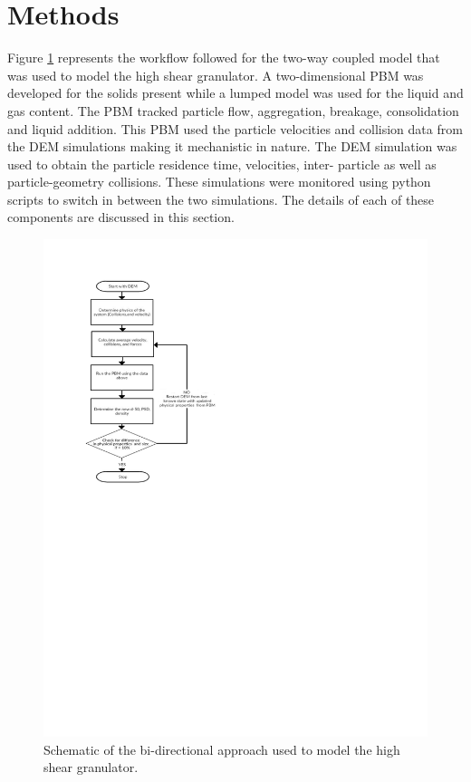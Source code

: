 \documentclass[fleqn,twoside,10pt]{article}
\begin{document}
\section{Methods}
\label{methods}
Figure \ref{fig:mthds_flow_dia} represents the workflow followed for the two-way coupled model that was used to model 
the high shear granulator. A two-dimensional PBM was developed for the solids present while a lumped model was 
used for the liquid and gas content. The PBM tracked particle flow, aggregation, breakage, 
consolidation and liquid addition. This PBM used the particle velocities and collision data from the DEM simulations 
making it mechanistic in nature. The DEM simulation was used to obtain the 
particle residence time, velocities, inter-
particle as well as particle-geometry collisions. These simulations were monitored using python scripts to switch 
in between the two simulations. The details of each of these components are discussed in this section. 

\begin{figure}
\centering
\includegraphics[scale=1]{flo_dia.pdf}
\caption{Schematic of the bi-directional approach used to model the high shear granulator.}
\label{fig:mthds_flow_dia}
\end{figure}
\lipsum[0]
\end{document}
